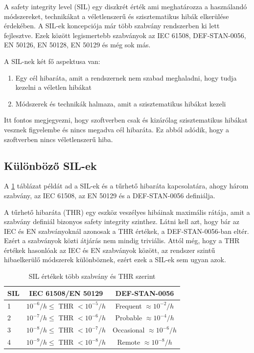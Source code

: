 A safety integrity level (SIL) egy diszkrét érték ami meghatározza a használandó módszereket, technikákat a véletlenszerű és szisztematikus hibák elkerülése érdekében.
A SIL-ek koncepciója már több szabvány rendszerben ki lett fejlesztve.
Ezek között legismertebb szabványok az IEC 61508, DEF-STAN-0056, EN 50126, EN 50128, EN 50129 és még sok más.

A SIL-nek két fő aspektusa van:
\begin{enumerate}
    \item Egy cél hibaráta, amit a rendszernek nem szabad meghaladni, hogy tudja kezelni a véletlen hibákat
    \item Módszerek és technikák halmaza, amit a szisztematikus hibákat kezeli 
\end{enumerate}

Itt fontos megjegyezni, hogy szoftverben csak és kizárólag szisztematikus hibákat vesznek figyelembe és nincs megadva cél hibaráta. Ez abból adódik, hogy a szoftverben nincs véletlenszerű hiba.

\subsection{Különböző SIL-ek}
A \ref{tab:SILs} táblázat példát ad a SIL-ek és a tűrhető hibaráta kapcsolatára, ahogy három szabvány, az IEC 61508, az EN 50129 és a DEF-STAN-0056 definiálja.

A tűrhető hibaráta (THR) egy eszköz veszélyes hibáinak maximális rátája, amit a szabvány definiál bizonyos safety integrity szinthez.
Látni kell azt, hogy bár az IEC és EN szabványoknál azonosak a THR értékek, a DEF-STAN-0056-ban eltér.
Ezért a szabványok közti átjárás nem mindig triviális.
Attól még, hogy a THR értékek hasonlóak az IEC és EN szabványok között, az rendszer szintű hibaelkerülő módszerek különböznek, ezért ezek a SIL-ek sem ugyan azok.
\begin{table}[ht]
	\footnotesize
	\centering
	\begin{tabular}{ l c c }
		\toprule
		SIL & IEC 61508/EN 50129 & DEF-STAN-0056 \\
		\midrule
		1 & \(10^{-6}/h \leq\) THR \(< 10^{-5}/h\) & Frequent \(\approx 10^{-2}/h\)\\
		2 & \(10^{-7}/h \leq\) THR \(< 10^{-6}/h\)  & Probable \(\approx 10^{-4}/h\)\\
		3 & \(10^{-8}/h \leq\) THR \(< 10^{-7}/h\)  & Occasional \(\approx 10^{-6}/h\)\\
		4 & \(10^{-9}/h \leq\) THR \(< 10^{-8}/h\)  & Remote \(\approx 10^{-8}/h\) \\
		\bottomrule
	\end{tabular}
	\caption{SIL értékek több szabvány és THR szerint}
	\label{tab:SILs}
\end{table}

